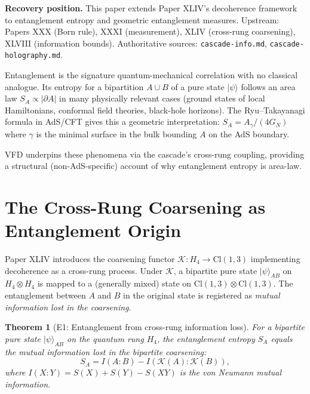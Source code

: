 \documentclass[12pt]{article}
\newtheorem{theorem}{Theorem}
\theoremstyle{remark}
\begin{document}
\textbf{Recovery position.} This paper extends Paper XLIV's decoherence framework to entanglement entropy and geometric entanglement measures. Upstream: Papers XXX (Born rule), XXXI (measurement), XLIV (cross-rung coarsening), XLVIII (information bounds). Authoritative sources: \texttt{cascade-info.md}, \texttt{cascade-holography.md}.

Entanglement is the signature quantum-mechanical correlation with no classical analogue. Its entropy for a bipartition $A \cup B$ of a pure state $|\psi\rangle$ follows an area law $S_A \propto |\partial A|$ in many physically relevant cases (ground states of local Hamiltonians, conformal field theories, black-hole horizons). The Ryu--Takayanagi formula in AdS/CFT gives this a geometric interpretation: $S_A = A_\gamma / (4 G_N)$ where $\gamma$ is the minimal surface in the bulk bounding $A$ on the AdS boundary.

VFD underpins these phenomena via the cascade's cross-rung coupling, providing a structural (non-AdS-specific) account of why entanglement entropy is area-law.

\section{The Cross-Rung Coarsening as Entanglement Origin}\label{sec:coarsening}

Paper XLIV introduces the coarsening functor $\mathcal{K}: H_4 \to \mathrm{Cl}(1,3)$ implementing decoherence as a cross-rung process. Under $\mathcal{K}$, a bipartite pure state $|\psi\rangle_{AB}$ on $H_4 \otimes H_4$ is mapped to a (generally mixed) state on $\mathrm{Cl}(1,3) \otimes \mathrm{Cl}(1,3)$. The entanglement between $A$ and $B$ in the original state is registered as \emph{mutual information lost in the coarsening}.

\begin{theorem}[E1: Entanglement from cross-rung information loss]\label{thm:entanglement-origin}
For a bipartite pure state $|\psi\rangle_{AB}$ on the quantum rung $H_4$, the entanglement entropy $S_A$ equals the mutual information lost in the bipartite coarsening:
\begin{equation}
S_A = I(A : B) - I(\mathcal{K}(A) : \mathcal{K}(B)),
\end{equation}
where $I(X : Y) = S(X) + S(Y) - S(XY)$ is the von Neumann mutual information.
\end{theorem}
\end{document}
